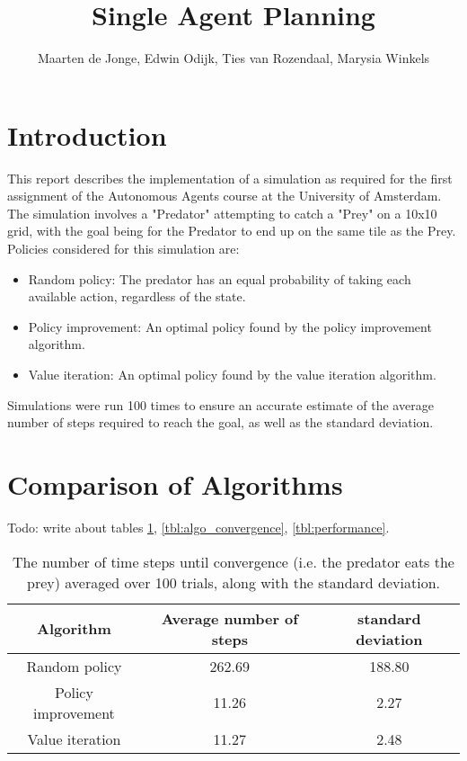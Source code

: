 \documentclass[a4paper, 12pt]{article}
\begin{document}
\title{Single Agent Planning}
\author{Maarten de Jonge, Edwin Odijk, Ties van Rozendaal, Marysia Winkels}
\maketitle

\section*{Introduction}
This report describes the implementation of a simulation as required for the first assignment of the Autonomous Agents course at the University of Amsterdam. The simulation involves a "Predator" attempting to catch a "Prey" on a 10x10 grid, with the goal being for the Predator to end up on the same tile as the Prey.\\
Policies considered for this simulation are:
\begin{itemize}
	\item Random policy: The predator has an equal probability of taking each
		available action, regardless of the state.
	\item Policy improvement: An optimal policy found by the policy improvement
		algorithm.
	\item Value iteration: An optimal policy found by the value iteration
		algorithm.
\end{itemize}

Simulations were run 100 times to ensure an accurate estimate of the average number of steps required to reach the goal, as well as the standard deviation.

\section*{Comparison of Algorithms}

Todo: write about tables \ref{tbl:sim_convergence}, \ref{tbl:algo_convergence},
\ref{tbl:performance}.

\begin{table}[htb]
	\begin{tabular}{|c|c|c|}
		\hline
		Algorithm & Average number of steps & standard deviation \\
		\hline
		Random policy & 262.69 & 188.80 \\
		Policy improvement & 11.26 & 2.27 \\
		Value iteration & 11.27 & 2.48 \\
		\hline
	\end{tabular}
	\caption{The number of time steps until convergence (i.e. the predator eats
		the prey) averaged over 100 trials, along with the standard deviation.}
	\label{tbl:sim_convergence}
\end{table}
\end{document}
